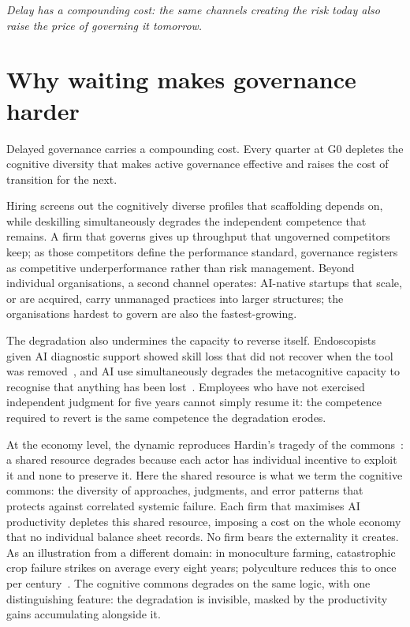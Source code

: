\documentclass[11pt,a4paper]{article}
\newcommand{\bridgeskip}{\vspace{6pt}}
\begin{document}
\bridgeskip
\noindent\emph{Delay has a compounding cost: the same channels creating the risk
today also raise the price of governing it tomorrow.}
\section{Why waiting makes governance harder}

Delayed governance carries a compounding cost. Every quarter at G0 depletes the
cognitive diversity that makes active governance effective and raises the cost of
transition for the next.

Hiring screens out the cognitively diverse profiles that scaffolding depends on,
while deskilling simultaneously degrades the independent competence that remains.
A firm that governs gives up throughput that ungoverned competitors keep; as those
competitors define the performance standard, governance registers as competitive
underperformance rather than risk management. Beyond individual organisations, a
second channel operates: AI-native startups that scale, or are acquired, carry
unmanaged practices into larger structures; the organisations hardest to govern
are also the fastest-growing.

The degradation also undermines the capacity to reverse itself. Endoscopists given AI diagnostic support showed skill loss that did not
recover when the tool was removed~\cite{budzyn_lancetgh_2025}, and AI use
simultaneously degrades the metacognitive capacity to recognise that anything has
been lost~\cite{fan_bjet_2025}. Employees who have not exercised independent
judgment for five years cannot simply resume it: the competence required to revert
is the same competence the degradation erodes.

At the economy level, the dynamic reproduces Hardin's tragedy of the
commons~\cite{hardin_science_1968}: a shared resource degrades because each
actor has individual incentive to exploit it and none to preserve it. Here the
shared resource is what we term the cognitive commons: the diversity of
approaches, judgments, and error patterns that protects against correlated
systemic failure. Each firm that maximises AI productivity depletes this shared resource, imposing
a cost on the whole economy that no individual balance sheet records. No firm
bears the externality it creates. As an illustration from a different domain: in
monoculture farming, catastrophic crop failure strikes on average every eight
years; polyculture reduces this to once per century~\cite{renard_nature_2019}.
The cognitive commons degrades on the same logic, with one distinguishing
feature: the degradation is invisible, masked by the productivity gains
accumulating alongside it.
\end{document}
